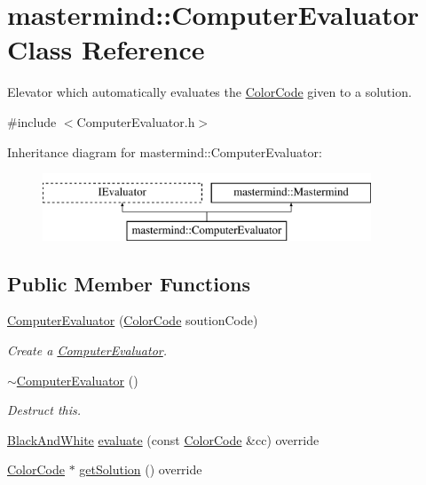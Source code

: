 \hypertarget{classmastermind_1_1_computer_evaluator}{}\section{mastermind\+:\+:Computer\+Evaluator Class Reference}
\label{classmastermind_1_1_computer_evaluator}


Elevator which automatically evaluates the \hyperlink{classmastermind_1_1_color_code}{Color\+Code} given to a solution.  




{\ttfamily \#include $<$Computer\+Evaluator.\+h$>$}

Inheritance diagram for mastermind\+:\+:Computer\+Evaluator\+:\begin{figure}[H]
\begin{center}
\leavevmode
\includegraphics[height=2.000000cm]{classmastermind_1_1_computer_evaluator}
\end{center}
\end{figure}
\subsection*{Public Member Functions}
\begin{DoxyCompactItemize}
\item 
\hyperlink{classmastermind_1_1_computer_evaluator_af0d7d2096b2eb790ee04bd426c39be3f}{Computer\+Evaluator} (\hyperlink{classmastermind_1_1_color_code}{Color\+Code} soution\+Code)
\begin{DoxyCompactList}\small\item\em Create a \hyperlink{classmastermind_1_1_computer_evaluator}{Computer\+Evaluator}. \end{DoxyCompactList}\item 
\hypertarget{classmastermind_1_1_computer_evaluator_aa787db68a1e57120530a2162588ead1b}{}\label{classmastermind_1_1_computer_evaluator_aa787db68a1e57120530a2162588ead1b} 
\hyperlink{classmastermind_1_1_computer_evaluator_aa787db68a1e57120530a2162588ead1b}{$\sim$\+Computer\+Evaluator} ()
\begin{DoxyCompactList}\small\item\em Destruct this. \end{DoxyCompactList}\item 
\hyperlink{classmastermind_1_1_black_and_white}{Black\+And\+White} \hyperlink{classmastermind_1_1_computer_evaluator_a62617d1ae59e1bfab0b980e7d1864f71}{evaluate} (const \hyperlink{classmastermind_1_1_color_code}{Color\+Code} \&cc) override
\item 
\hyperlink{classmastermind_1_1_color_code}{Color\+Code} $\ast$ \hyperlink{classmastermind_1_1_computer_evaluator_ab023cf3e1547411098fa69074f5fc983}{get\+Solution} () override
\end{DoxyCompactItemize}
